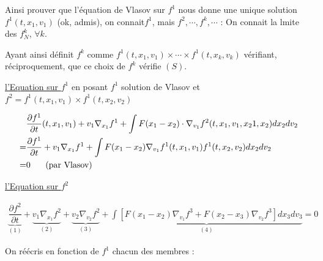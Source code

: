 \documentclass[12pt,a4paper]{article}
\begin{document}
	Ainsi prouver que l'équation de Vlasov sur $f^1$ nous donne une unique solution $f^1(t,x_1,v_1)$ (ok, admis), on connait$f^1$, mais $f^2,\cdots,f^k,\cdots$ : On connait la lmite des $f_N^k$, $\forall k$.
	
	\par Ayant ainsi définit $f^k$ comme $f^1(t,x_1,v_1)\times\cdots\times f^1(t,x_k,v_k)$ vérifiant, réciproquement, que ce choix de $f^k$ vérifie $(S)$.
	
	\newpage
	
	\underline{l'Equation sur $f^1$} en posant $f^1$ solution de Vlasov et $f^2 = f^1(t,x_1,v_1)\times f^1(t,x_2,v_2)$
	
	\[\begin{aligned}
		&\dfrac{\partial f^1}{\partial t}(t,x_1,v_1) + v_1\nabla_{x_1}f^1 + \displaystyle\int F(x_1-x_2)\cdot\nabla_{v_1}f^2(t,x_1,v_1,x_21,x_2)dx_2dv_2 \\
		=& \dfrac{\partial f^1}{\partial t} + v_1\nabla_{x_1}f^1 + \int F(x_1-x_2)\nabla_{v_1}f^1(t,x_1,v_1)f^1(t,x_2,v_2)dx_2dv_2 \\
		=& 0 \text{\hspace{.5cm} (par Vlasov)}
	\end{aligned}\]
	
	\underline{l'Equation sur $f^2$}
	
	\[\begin{aligned}
		\underbrace{\dfrac{\partial f^2}{\partial t}}_{(1)} + \underbrace{v_1\nabla_{x_1}f^2}_{(2)} + \underbrace{v_2\nabla_{v_2}f^2}_{(3)} + \underbrace{\displaystyle\int\left[F(x_1-x_2)\nabla_{v_1}f^3 + F(x_2-x_3)\nabla_{v_2}f^3\right]dx_3dv_3}_{(4)} = 0
	\end{aligned}\]
	
	On réécris en fonction de $f^1$ chacun des membres :
	
\end{document}
